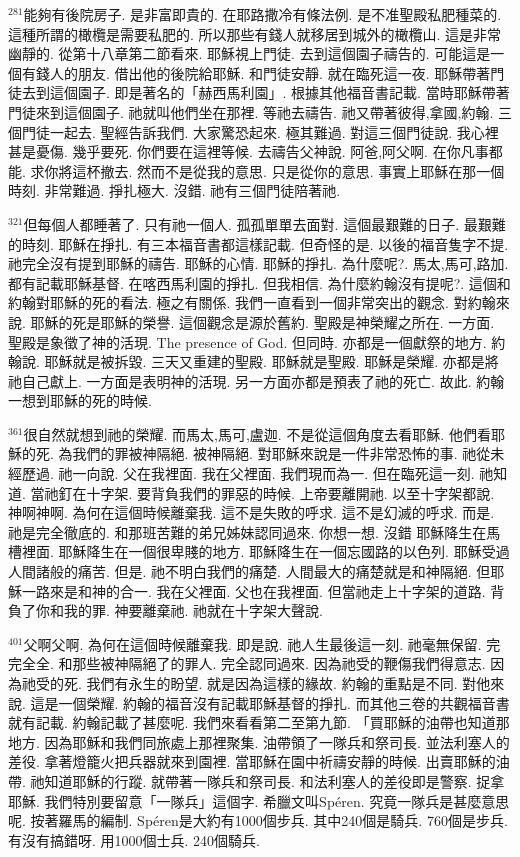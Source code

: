 \documentclass{book}
\begin{document}
$^{281}$能夠有後院房子.
是非富即貴的.
在耶路撒冷有條法例.
是不准聖殿私肥種菜的.
這種所謂的橄欖是需要私肥的.
所以那些有錢人就移居到城外的橄欖山.
這是非常幽靜的.
從第十八章第二節看來.
耶穌視上門徒.
去到這個園子禱告的.
可能這是一個有錢人的朋友.
借出他的後院給耶穌.
和門徒安靜.
就在臨死這一夜.
耶穌帶著門徒去到這個園子.
即是著名的「赫西馬利園」.
根據其他福音書記載.
當時耶穌帶著門徒來到這個園子.
祂就叫他們坐在那裡.
等祂去禱告.
祂又帶著彼得,拿國,約翰.
三個門徒一起去.
聖經告訴我們.
大家驚恐起來.
極其難過.
對這三個門徒說.
我心裡甚是憂傷.
幾乎要死.
你們要在這裡等候.
去禱告父神說.
阿爸,阿父啊.
在你凡事都能.
求你將這杯撤去.
然而不是從我的意思.
只是從你的意思.
事實上耶穌在那一個時刻.
非常難過.
掙扎極大.
沒錯.
祂有三個門徒陪著祂.

$^{321}$但每個人都睡著了.
只有祂一個人.
孤孤單單去面對.
這個最艱難的日子.
最艱難的時刻.
耶穌在掙扎.
有三本福音書都這樣記載.
但奇怪的是.
以後的福音隻字不提.
祂完全沒有提到耶穌的禱告.
耶穌的心情.
耶穌的掙扎.
為什麼呢?.
馬太,馬可,路加.
都有記載耶穌基督.
在喀西馬利園的掙扎.
但我相信.
為什麼約翰沒有提呢?.
這個和約翰對耶穌的死的看法.
極之有關係.
我們一直看到一個非常突出的觀念.
對約翰來說.
耶穌的死是耶穌的榮譽.
這個觀念是源於舊約.
聖殿是神榮耀之所在.
一方面.
聖殿是象徵了神的活現.
The presence of God.
但同時.
亦都是一個獻祭的地方.
約翰說.
耶穌就是被拆毀.
三天又重建的聖殿.
耶穌就是聖殿.
耶穌是榮耀.
亦都是將祂自己獻上.
一方面是表明神的活現.
另一方面亦都是預表了祂的死亡.
故此.
約翰一想到耶穌的死的時候.

$^{361}$很自然就想到祂的榮耀.
而馬太,馬可,盧迦.
不是從這個角度去看耶穌.
他們看耶穌的死.
為我們的罪被神隔絕.
被神隔絕.
對耶穌來說是一件非常恐怖的事.
祂從未經歷過.
祂一向說.
父在我裡面.
我在父裡面.
我們現而為一.
但在臨死這一刻.
祂知道.
當祂釘在十字架.
要背負我們的罪惡的時候.
上帝要離開祂.
以至十字架都說.
神啊神啊.
為何在這個時候離棄我.
這不是失敗的呼求.
這不是幻滅的呼求.
而是.
祂是完全徹底的.
和那班苦難的弟兄姊妹認同過來.
你想一想.
沒錯 耶穌降生在馬槽裡面.
耶穌降生在一個很卑賤的地方.
耶穌降生在一個忘國路的以色列.
耶穌受過人間諸般的痛苦.
但是.
祂不明白我們的痛楚.
人間最大的痛楚就是和神隔絕.
但耶穌一路來是和神的合一.
我在父裡面.
父也在我裡面.
但當祂走上十字架的道路.
背負了你和我的罪.
神要離棄祂.
祂就在十字架大聲說.

$^{401}$父啊父啊.
為何在這個時候離棄我.
即是說.
祂人生最後這一刻.
祂毫無保留.
完完全全.
和那些被神隔絕了的罪人.
完全認同過來.
因為祂受的鞭傷我們得意志.
因為祂受的死.
我們有永生的盼望.
就是因為這樣的緣故.
約翰的重點是不同.
對他來說.
這是一個榮耀.
約翰的福音沒有記載耶穌基督的掙扎.
而其他三卷的共觀福音書就有記載.
約翰記載了甚麼呢.
我們來看看第二至第九節.
「買耶穌的油帶也知道那地方.
因為耶穌和我們同旅處上那裡聚集.
油帶領了一隊兵和祭司長.
並法利塞人的差役.
拿著燈籠火把兵器就來到園裡.
當耶穌在園中祈禱安靜的時候.
出賣耶穌的油帶.
祂知道耶穌的行蹤.
就帶著一隊兵和祭司長.
和法利塞人的差役即是警察.
捉拿耶穌.
我們特別要留意「一隊兵」這個字.
希臘文叫Spéren.
究竟一隊兵是甚麼意思呢.
按著羅馬的編制.
Spéren是大約有1000個步兵.
其中240個是騎兵.
760個是步兵.
有沒有搞錯呀.
用1000個士兵.
240個騎兵.
\end{document}
